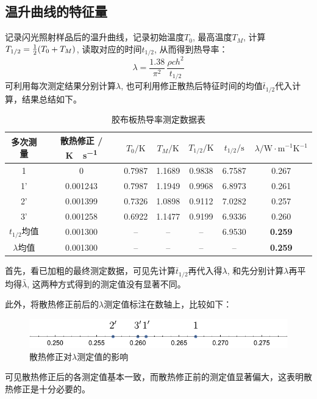 \documentclass[a4paper,11pt]{article}
\begin{document}
\subsection{温升曲线的特征量}
	记录闪光照射样品后的温升曲线，记录初始温度$T_0$, 最高温度$T_M$, 计算
		$T_{1/2} = \frac{1}{2}\pqty{T_0 + T_M}$, 读取对应的时间$t_{1/2}$, 
	从而得到热导率：
	\begin{equation}
		\lambda = \frac{1.38}{\pi^2}\,\frac{\rho c h^2}{t_{1/2}}
	\end{equation}
	可利用每次测定结果分别计算$\lambda$, 也可利用修正散热后特征时间的均值$\bar{t}_{1/2}$代入计算，结果总结如下。
	\begin{table}[H]
	\centering\caption{胶布板热导率测定数据表}
	\small
	\begin{tabularx}{.95\linewidth}{C{.6} C{1} *4{C{.4}} C{1}}
	\toprule
		多次测量 &
		\footnotesize 散热修正 / \si{\kelvin\cdot\s^{-1}} &
		$T_0 / \si{\kelvin}$ &
		$T_M / \si{\kelvin}$ &
		$T_{1/2} / \si{\kelvin}$ &
		$t_{1/2} / \si{\s}$ &
		\footnotesize $\lambda / \si{\watt\cdot\m^{-1}\K^{-1}}$ \\
	     & 0     & 0.7987 & 1.1689 & 0.9838 & 6.7587 & 0.267 \\
	'    & 0.001243 & 0.7987 & 1.1949 & 0.9968 & 6.8973 & 0.261 \\
		2'    & 0.001399 & 0.7326 & 1.0898 & 0.9112 & 7.0282 & 0.257 \\
		3'    & 0.001258 & 0.6922 & 1.1477 & 0.9199 & 6.9336 & 0.260 \\
		$t_{1/2}$均值   & 0.001300 &  --   &  --   &  --   & 6.9530 & \bfseries 0.259 \\
		$\lambda$均值 & 0.001300 &  --   &   --  &   --  &  --   & \bfseries 0.259 \\
	\bottomrule
	\end{tabularx}
	\end{table}
	
	首先，看已加粗的最终测定数据，可见先计算$\bar{t}_{1/2}$再代入得$\lambda$, 和先分别计算$\lambda$再平均得$\bar{\lambda}$, 这两种方式得到的测定值没有显著不同。
	
	此外，将散热修正前后的$\lambda$测定值标注在数轴上，比较如下：
	\begin{figure}[H]
	\centering
	\includegraphics[width=.8\linewidth]{lineplot}
	\caption{散热修正对$\lambda$测定值的影响}
	\end{figure}\noindent%
	可见散热修正后的各测定值基本一致，而散热修正前的测定值显著偏大，这表明散热修正是十分必要的。
	
\end{document}
